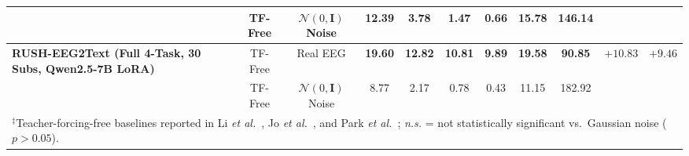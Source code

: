 \documentclass[journal]{IEEEtran}
\begin{document}
\begin{table}[t]
{\begin{tabular}{l c c c c c c c c c c}
 & TF-Free & $\mathcal{N}(0,\mathbf{I})$ Noise & 12.39 & 3.78 & 1.47 & 0.66 & 15.78 & 146.14 & & \\
\midrule
\multirow{2}{*}{\textbf{RUSH-EEG2Text (Full 4-Task, 30 Subs, Qwen2.5-7B LoRA)}} & TF-Free & Real EEG & \textbf{19.60} & \textbf{12.82} & \textbf{10.81} & \textbf{9.89} & \textbf{19.58} & \textbf{90.85} & \multirow{2}{*}{$\mathbf{+10.83}$} & \multirow{2}{*}{$\mathbf{+9.46}$} \\
 & TF-Free & $\mathcal{N}(0,\mathbf{I})$ Noise & 8.77 & 2.17 & 0.78 & 0.43 & 11.15 & 182.92 & & \\
\bottomrule
\multicolumn{11}{l}{\footnotesize $^\ddagger$Teacher-forcing-free baselines reported in Li \textit{et al.}~\cite{li2025brainecho}, Jo \textit{et al.}~\cite{jo2024are}, and Park \textit{et al.}~\cite{park2026lurs}; \textit{n.s.} = not statistically significant vs.\ Gaussian noise ($p>0.05$).}
\end{tabular}%
}
\end{table}
\end{document}
